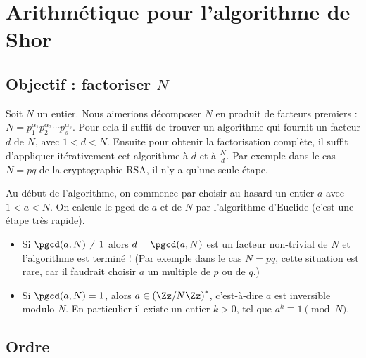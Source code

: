\documentclass[11pt,class=report,crop=false]{standalone}
\begin{document}




\section{Arithmétique pour l'algorithme de Shor}

\subsection{Objectif : factoriser $N$}

Soit $N$ un entier. Nous aimerions décomposer $N$ en produit de facteurs premiers : $N = p_1^{\alpha_1}p_2^{\alpha_2}\cdots p_s^{\alpha_s}$.
Pour cela il suffit de trouver un algorithme qui fournit un facteur $d$ de $N$, avec $1 < d < N$. Ensuite pour obtenir la factorisation complète, il suffit d'appliquer itérativement cet algorithme à $d$ et à $\frac{N}{d}$. Par exemple dans le cas $N=pq$ de la cryptographie RSA, il n'y a qu'une seule étape.

Au début de l'algorithme, on commence par choisir au hasard un entier $a$ avec $1<a<N$.
On calcule le pgcd de $a$ et de $N$ par l'algorithme d'Euclide (c'est une étape très rapide). 
\begin{itemize}
  \item Si $\pgcd(a,N) \neq 1$ alors $d = \pgcd(a,N)$ est un facteur non-trivial de $N$ et l'algorithme est terminé ! (Par exemple dans le cas $N=pq$, cette situation est rare, car il faudrait choisir $a$ un multiple de $p$ ou de $q$.)
  \item Si $\pgcd(a,N) = 1$, alors $a \in \left(\Zz/N\Zz\right)^*$, c'est-à-dire $a$ est inversible modulo $N$. En particulier il existe un entier $k>0$, tel que $a^k \equiv 1 \pmod{N}$. 
\end{itemize}


\subsection{Ordre}
\end{document}
